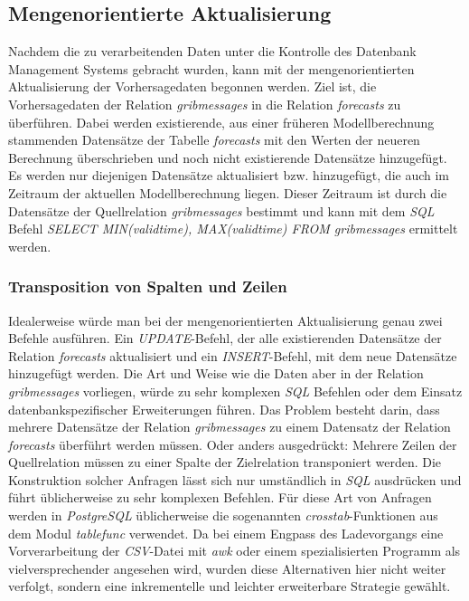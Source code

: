 \subsection{Mengenorientierte Aktualisierung}
Nachdem die zu verarbeitenden Daten unter die Kontrolle des Datenbank
Management Systems gebracht wurden, kann mit der mengenorientierten
Aktualisierung der Vorhersagedaten begonnen werden. Ziel ist, die
Vorhersagedaten der Relation \textit{grib\textunderscore messages} in
die Relation \textit{forecasts} zu überführen. Dabei werden
existierende, aus einer früheren Modellberechnung stammenden
Datensätze der Tabelle \textit{forecasts} mit den Werten der neueren
Berechnung überschrieben und noch nicht existierende Datensätze
hinzugefügt. Es werden nur diejenigen Datensätze aktualisiert bzw.
hinzugefügt, die auch im Zeitraum der aktuellen Modellberechnung
liegen. Dieser Zeitraum ist durch die Datensätze der Quellrelation
\textit{grib\textunderscore messages} bestimmt und kann mit dem
\textit{SQL} Befehl \textit{SELECT MIN(valid\textunderscore time),
  MAX(valid\textunderscore time) FROM grib\textunderscore messages}
ermittelt werden.

\subsubsection{Transposition von Spalten und Zeilen}
Idealerweise würde man bei der mengenorientierten Aktualisierung genau
zwei Befehle ausführen. Ein \textit{UPDATE}-Befehl, der alle
existierenden Datensätze der Relation \textit{forecasts} aktualisiert
und ein \textit{INSERT}-Befehl, mit dem neue Datensätze hinzugefügt
werden. Die Art und Weise wie die Daten aber in der Relation
\textit{grib\textunderscore messages} vorliegen, würde zu sehr
komplexen \textit{SQL} Befehlen oder dem Einsatz datenbankspezifischer
Erweiterungen führen. Das Problem besteht darin, dass mehrere
Datensätze der Relation \textit{grib\textunderscore messages} zu einem
Datensatz der Relation \textit{forecasts} überführt werden
müssen. Oder anders ausgedrückt: Mehrere Zeilen der Quellrelation
müssen zu einer Spalte der Zielrelation transponiert werden. Die
Konstruktion solcher Anfragen lässt sich nur umständlich in
\textit{SQL} ausdrücken und führt üblicherweise zu sehr komplexen
Befehlen. Für diese Art von Anfragen werden in \textit{PostgreSQL}
üblicherweise die sogenannten \textit{crosstab}-Funktionen aus dem
Modul \textit{tablefunc} verwendet. Da bei einem Engpass des
Ladevorgangs eine Vorverarbeitung der \textit{CSV}-Datei mit
\textit{awk} oder einem spezialisierten Programm als
vielversprechender angesehen wird, wurden diese Alternativen hier
nicht weiter verfolgt, sondern eine inkrementelle und leichter
erweiterbare Strategie gewählt.

